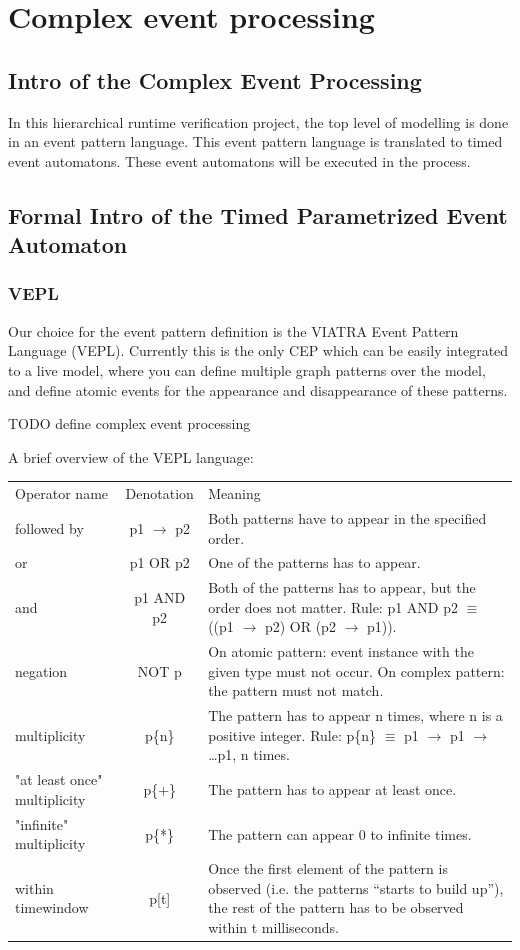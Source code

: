 \chapter{Complex event processing}
	\label{chap:cep}
	\section{Intro of the Complex Event Processing}
		In this hierarchical runtime verification project, the top level of modelling is done in an event pattern language.
		This event pattern language is translated to timed event automatons. These event automatons will be executed in the
		process.
	\section{Formal Intro of the Timed Parametrized Event Automaton}
		\subsection{VEPL}
			Our choice for the event pattern definition is the VIATRA Event Pattern Language (VEPL).
			Currently this is the only CEP which can be easily integrated to a live model, where 
			you can define multiple graph patterns over the model, and define atomic events for the
			appearance and disappearance of these patterns.
			
			TODO define complex event processing
			
			A brief overview of the VEPL language:

		\begin{tabular}{lcm{6cm}}
		\centering
		Operator name &	Denotation & Meaning \\
		followed by & p1 $\rightarrow$ p2 & Both patterns have to appear in the specified order. \\
		or &	p1 OR p2 &	One of the patterns has to appear. \\
		and &	p1 AND p2 &	Both of the patterns has to appear, but the order does not matter. Rule: p1 AND p2 $\equiv$ ((p1 $\rightarrow$ p2) OR (p2 $\rightarrow$ p1)). \\
		negation &	NOT p &	On atomic pattern: event instance with the given type must not occur. On complex pattern: the pattern must not match. \\
		multiplicity &	p\{n\} &	The pattern has to appear n times, where n is a positive integer. Rule: p\{n\} $\equiv$ p1 $\rightarrow$ p1 $\rightarrow$ \dots p1, n times. \\
		"at least once" multiplicity &	p\{+\} &	The pattern has to appear at least once. \\
		"infinite" multiplicity &	p\{*\} &	The pattern can appear 0 to infinite times. \\
		within timewindow &	p[t] &	Once the first element of the pattern is observed (i.e. the patterns ``starts to build up''), the rest of the pattern has to be observed within t milliseconds.
		\end{tabular}	
			
